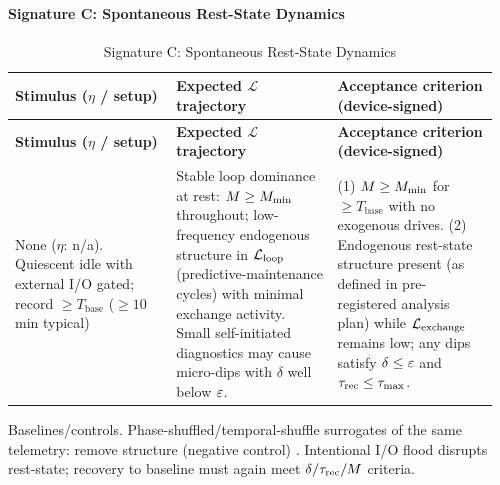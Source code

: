 \documentclass[11pt]{article}
\begin{document}
\paragraph{Signature C: Spontaneous Rest-State Dynamics}
\begin{longtable}{p{0.32\linewidth}p{0.32\linewidth}p{0.32\linewidth}}
\caption{Signature C: Spontaneous Rest-State Dynamics}\label{tab:signatureC}\\
\toprule
\textbf{Stimulus ($\eta$ / setup)} & \textbf{Expected $\mathcal{L}$ trajectory} & \textbf{Acceptance criterion (device-signed)} \\
\midrule
\endfirsthead
\toprule
\textbf{Stimulus ($\eta$ / setup)} & \textbf{Expected $\mathcal{L}$ trajectory} & \textbf{Acceptance criterion (device-signed)} \\
\midrule
\endhead
\bottomrule
\endlastfoot
None ($\eta$: n/a). Quiescent idle with external I/O gated; record $\geq T_{\text{base}}$ ($\geq 10$ min typical) & Stable loop dominance at rest: $M \geq M_{\min}$ throughout; low-frequency endogenous structure in $\mathcal{L}_{\text{loop}}$ (predictive-maintenance cycles) with minimal exchange activity. Small self-initiated diagnostics may cause micro-dips with $\delta$ well below $\varepsilon$. & (1) $M \geq M_{\min}$ for $\geq T_{\text{base}}$ with no exogenous drives. (2) Endogenous rest-state structure present (as defined in pre-registered analysis plan) while $\mathcal{L}_{\text{exchange}}$ remains low; any dips satisfy $\delta \leq \varepsilon$ and $\tau_{\text{rec}} \leq \tau_{\max}$. \\
\end{longtable}

Baselines/controls. Phase-shuffled/temporal-shuffle surrogates of the same telemetry: remove structure (negative control) \cite{theiler1992testing}. Intentional I/O flood disrupts rest-state; recovery to baseline must again meet $\delta/\tau_{\text{rec}}/M$ criteria.
\end{document}
